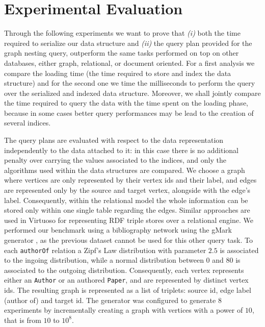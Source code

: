 \section{Experimental  Evaluation}\label{sec:nestexpeval}
Through the following experiments we want to prove that \textit{(i)} both the time required to serialize our data structure and \textit{(ii)} the query plan provided for the graph nesting query,  outperform the same tasks performed on top on other databases, either graph, relational, or document oriented. For a first analysis we compare the loading time (the time required to store and index the data structure) and for the second one we time the milliseconds to perform the query  over the serialized and indexed data structure. Moreover, we shall jointly compare the time required to query the data with the time spent on the loading phase, because in some cases better query performances may be lead to the creation of several indices.


The query plans are evaluated with respect to the data representation independently to the data attached to it: in this case there is no additional penalty over carrying the values associated to the indices, and only the algorithms used within the data structures are compared. We choose a graph where vertices are only represented by their vertex ids and their label, and edges are represented only by the source and target vertex, alongside with the edge's label. Consequently, within the relational model the whole information can be stored only within one single table regarding the edges. Similar approaches are used in Virtuoso for representing RDF triple stores over a relational engine. We performed our benchmark using  a bibliography network using the gMark generator \cite{BBCFLA17}, as the previous dataset cannot be used for this other query task. To each \texttt{authorOf} relation a Zipf's Law distribution with parameter $2.5$ is associated to the ingoing distribution, while a normal distribution between 0 and 80 is associated to the outgoing distribution. Consequently, each vertex represents either an \texttt{Author} or an authored \texttt{Paper}, and are represented by distinct vertex ids. The resulting graph is represented as a list of triplets: source id, edge label (author of) and target id. The generator was configured to generate $8$ experiments by incrementally creating a graph with vertices with a power of $10$, that is from $10$ to $10^8$.

